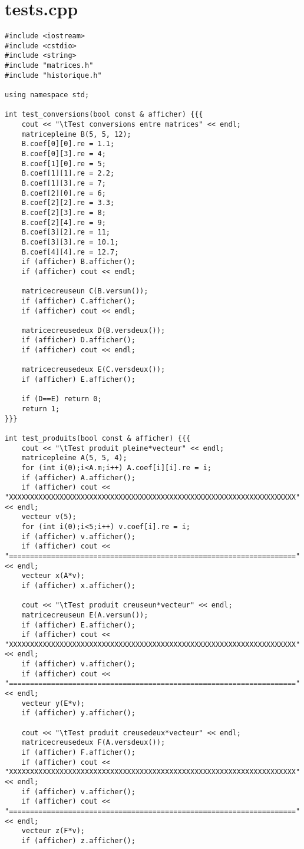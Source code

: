 \documentclass[a4paper]{article}
\begin{document}
\section{tests.cpp}
\begin{verbatim}
#include <iostream>
#include <cstdio>
#include <string>
#include "matrices.h"
#include "historique.h"

using namespace std;

int test_conversions(bool const & afficher) {{{
    cout << "\tTest conversions entre matrices" << endl;
    matricepleine B(5, 5, 12);
    B.coef[0][0].re = 1.1;
    B.coef[0][3].re = 4;
    B.coef[1][0].re = 5;
    B.coef[1][1].re = 2.2;
    B.coef[1][3].re = 7;
    B.coef[2][0].re = 6;
    B.coef[2][2].re = 3.3;
    B.coef[2][3].re = 8;
    B.coef[2][4].re = 9;
    B.coef[3][2].re = 11;
    B.coef[3][3].re = 10.1;
    B.coef[4][4].re = 12.7;
    if (afficher) B.afficher();
    if (afficher) cout << endl;

    matricecreuseun C(B.versun());
    if (afficher) C.afficher();
    if (afficher) cout << endl;

    matricecreusedeux D(B.versdeux());
    if (afficher) D.afficher();
    if (afficher) cout << endl;

    matricecreusedeux E(C.versdeux());
    if (afficher) E.afficher();

    if (D==E) return 0;
    return 1; 
}}}

int test_produits(bool const & afficher) {{{
    cout << "\tTest produit pleine*vecteur" << endl;
    matricepleine A(5, 5, 4);
    for (int i(0);i<A.m;i++) A.coef[i][i].re = i; 
    if (afficher) A.afficher();
    if (afficher) cout << "XXXXXXXXXXXXXXXXXXXXXXXXXXXXXXXXXXXXXXXXXXXXXXXXXXXXXXXXXXXXXXXXXXXX" << endl;
    vecteur v(5);
    for (int i(0);i<5;i++) v.coef[i].re = i;
    if (afficher) v.afficher();
    if (afficher) cout << "====================================================================" << endl;
    vecteur x(A*v);
    if (afficher) x.afficher();

    cout << "\tTest produit creuseun*vecteur" << endl;
    matricecreuseun E(A.versun());
    if (afficher) E.afficher();
    if (afficher) cout << "XXXXXXXXXXXXXXXXXXXXXXXXXXXXXXXXXXXXXXXXXXXXXXXXXXXXXXXXXXXXXXXXXXXX" << endl;
    if (afficher) v.afficher();
    if (afficher) cout << "====================================================================" << endl;
    vecteur y(E*v);
    if (afficher) y.afficher();

    cout << "\tTest produit creusedeux*vecteur" << endl;
    matricecreusedeux F(A.versdeux());
    if (afficher) F.afficher();
    if (afficher) cout << "XXXXXXXXXXXXXXXXXXXXXXXXXXXXXXXXXXXXXXXXXXXXXXXXXXXXXXXXXXXXXXXXXXXX" << endl;
    if (afficher) v.afficher();
    if (afficher) cout << "====================================================================" << endl;
    vecteur z(F*v);
    if (afficher) z.afficher();


\end{verbatim}
\end{document}

